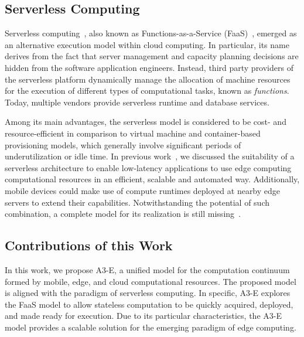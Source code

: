 
\subsection{Serverless Computing}

Serverless computing~\cite{roberts2016serverless, hendrickson2016serverless}, also known as Functions-as-a-Service (FaaS)~\cite{mateosFaas17}, emerged as an alternative execution model within cloud computing. In particular, its name derives from the fact that server management and capacity planning decisions are hidden from the software application engineers. Instead, third party providers of the serverless platform dynamically manage the allocation of machine resources for the execution of different types of computational tasks, known as \textit{functions}. Today, multiple vendors provide serverless runtime and database services. 

Among its main advantages, the serverless model is considered to be cost- and resource-efficient in comparison to virtual machine and container-based provisioning models, which generally involve significant periods of underutilization or idle time. In previous work~\cite{GarrigaMendonca2017}, we discussed the suitability of a serverless architecture to enable low-latency applications to use edge computing computational resources in an efficient, scalable and automated way. Additionally, mobile devices could make use of compute runtimes deployed at nearby edge servers to extend their capabilities. Notwithstanding the potential of such combination, a complete model for its realization is still missing~\cite{NasticServerlessEdge17}. 

\subsection{Contributions of this Work}

In this work, we propose A3-E, a unified model for the computation continuum formed by mobile, edge, and cloud computational resources. The proposed model is aligned with the paradigm of serverless computing. In specific, A3-E explores the FaaS model to allow stateless computation to be quickly acquired, deployed, and made ready for execution. Due to  its particular characteristics, the A3-E model provides a scalable solution for the emerging paradigm of edge computing. 

